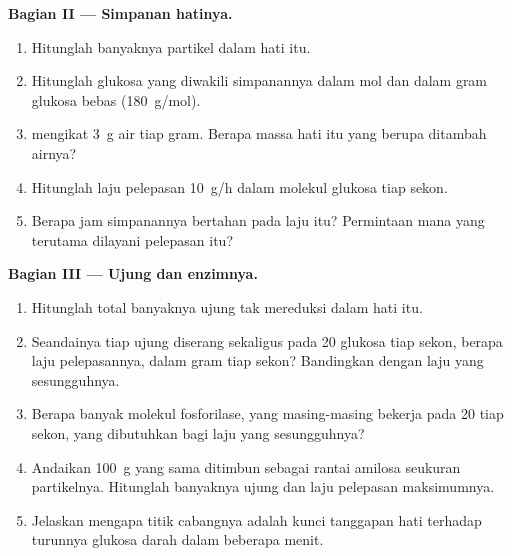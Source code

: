 \begin{problem}
\medskip
\noindent\textbf{Bagian II --- Simpanan hatinya.}
\begin{enumerate}[resume]
  \item Hitunglah banyaknya partikel dalam hati itu.
  \item Hitunglah glukosa yang diwakili simpanannya dalam mol dan dalam
        gram glukosa bebas (\qty{180}{g/mol}).
  \item {} mengikat \qty{3}{g} air tiap gram. Berapa massa hati
        itu yang berupa  ditambah airnya?
  \item Hitunglah laju pelepasan \qty{10}{g/h} dalam molekul glukosa
        tiap sekon.
  \item Berapa jam simpanannya bertahan pada laju itu? Permintaan 
        mana yang terutama dilayani pelepasan itu?
\end{enumerate}

\medskip
\noindent\textbf{Bagian III --- Ujung dan enzimnya.}
\begin{enumerate}[resume]
  \item Hitunglah total banyaknya ujung tak mereduksi dalam hati itu.
  \item Seandainya tiap ujung diserang sekaligus pada \qty{20}{} glukosa
        tiap sekon, berapa laju pelepasannya, dalam gram tiap sekon?
        Bandingkan dengan laju yang sesungguhnya.
  \item Berapa banyak molekul fosforilase, yang masing-masing bekerja
        pada \qty{20}{} tiap sekon, yang dibutuhkan bagi laju yang
        sesungguhnya?
  \item Andaikan \qty{100}{g} yang sama ditimbun sebagai rantai amilosa
        seukuran partikelnya. Hitunglah banyaknya ujung dan laju
        pelepasan maksimumnya.
  \item Jelaskan mengapa titik cabangnya adalah kunci tanggapan hati
        terhadap turunnya glukosa darah dalam beberapa menit.
\end{enumerate}


\end{problem}
